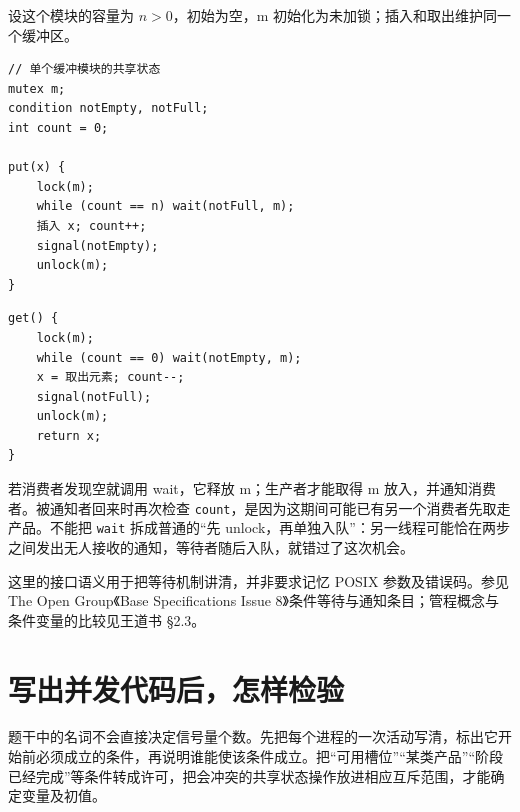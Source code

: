 设这个模块的容量为 \(n>0\)，初始为空，m 初始化为未加锁；插入和取出维护同一个缓冲区。

\par\medskip\noindent
\begin{minipage}{\linewidth}
\begin{verbatim}
// 单个缓冲模块的共享状态
mutex m;
condition notEmpty, notFull;
int count = 0;

put(x) {
    lock(m);
    while (count == n) wait(notFull, m);
    插入 x; count++;
    signal(notEmpty);
    unlock(m);
}
\end{verbatim}
\end{minipage}\par\medskip

\par\medskip\noindent
\begin{minipage}{\linewidth}
\begin{verbatim}
get() {
    lock(m);
    while (count == 0) wait(notEmpty, m);
    x = 取出元素; count--;
    signal(notFull);
    unlock(m);
    return x;
}
\end{verbatim}
\end{minipage}\par\medskip

若消费者发现空就调用 wait，它释放 m；生产者才能取得 m 放入，并通知消费者。被通知者回来时再次检查 \allowbreak{}\texttt{count}，是因为这期间可能已有另一个消费者先取走产品。不能把 \allowbreak{}\texttt{wait} 拆成普通的``先 unlock，再单独入队''：另一线程可能恰在两步之间发出无人接收的通知，等待者随后入队，就错过了这次机会。

这里的接口语义用于把等待机制讲清，并非要求记忆 POSIX 参数及错误码。参见 The Open Group《Base Specifications Issue 8》条件等待与通知条目；管程概念与条件变量的比较见王道书 §2.3。

\section{写出并发代码后，怎样检验}\label{sec-method}

题干中的名词不会直接决定信号量个数。先把每个进程的一次活动写清，标出它开始前必须成立的条件，再说明谁能使该条件成立。把``可用槽位''``某类产品''``阶段已经完成''等条件转成许可，把会冲突的共享状态操作放进相应互斥范围，才能确定变量及初值。

